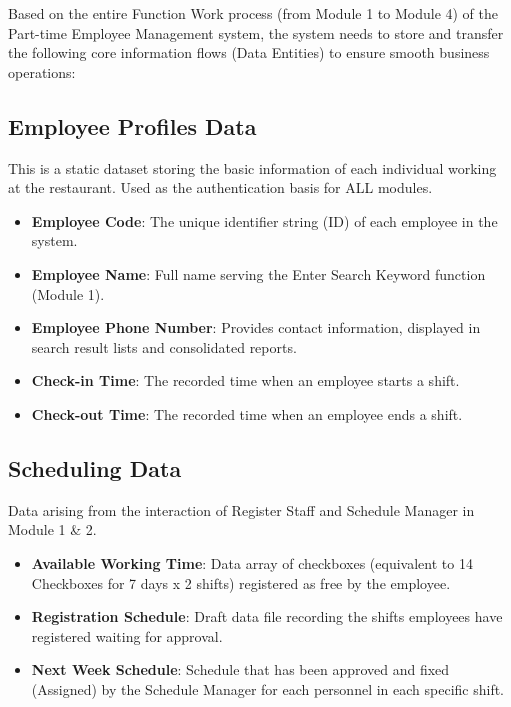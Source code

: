 Based on the entire Function Work process (from Module 1 to Module 4) of the Part-time Employee Management system, the system needs to store and transfer the following core information flows (Data Entities) to ensure smooth business operations:

\subsection{Employee Profiles Data}
This is a static dataset storing the basic information of each individual working at the restaurant. Used as the authentication basis for ALL modules.
\begin{itemize}
    \item \textbf{Employee Code}: The unique identifier string (ID) of each employee in the system.
    \item \textbf{Employee Name}: Full name serving the Enter Search Keyword function (Module 1).
    \item \textbf{Employee Phone Number}: Provides contact information, displayed in search result lists and consolidated reports.
    \item \textbf{Check-in Time}: The recorded time when an employee starts a shift.
    \item \textbf{Check-out Time}: The recorded time when an employee ends a shift.
\end{itemize}

\subsection{Scheduling Data}
Data arising from the interaction of Register Staff and Schedule Manager in Module 1 \& 2.
\begin{itemize}
    \item \textbf{Available Working Time}: Data array of checkboxes (equivalent to 14 Checkboxes for 7 days x 2 shifts) registered as free by the employee.
    \item \textbf{Registration Schedule}: Draft data file recording the shifts employees have registered waiting for approval.
    \item \textbf{Next Week Schedule}: Schedule that has been approved and fixed (Assigned) by the Schedule Manager for each personnel in each specific shift.
\end{itemize}


